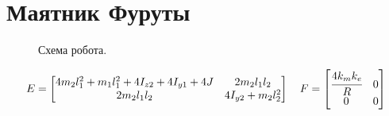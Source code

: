 \documentclass[12pt,a4paper,openany]{extarticle}
\begin{document}
\part*{Маятник Фуруты}

\begin{figure}[h]
	\noindent{}
	\caption{Схема робота.}
	\label{fig:scheme_of_robot}
\end{figure}

\begin{equation}
E = 
\begin{bmatrix}
4m_2l_1^2+m_1l_1^2+4I_{z2}+4I_{y1}+4J & 2m_2l_1l_2 \\
2m_2l_1l_2 & 4I_{y2}+m_2l_2^2
\end{bmatrix}
\quad
F = 
\begin{bmatrix}
\cfrac{4k_mk_e}{R} & 0\\
0 & 0
\end{bmatrix}
\end{equation}
\end{document}
